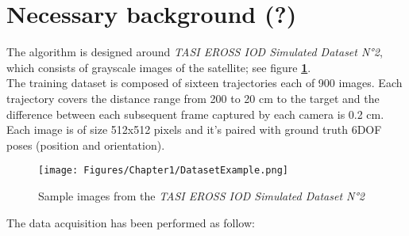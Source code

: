 \section{Necessary background (?)}
\label{Chapter1/Dataset}
The algorithm is designed around \textit{TASI EROSS IOD Simulated Dataset N°2}, which consists of grayscale images of the satellite; see figure \textbf{\ref{fig:Samples}}.\\
The training dataset is composed of sixteen trajectories each of 900 images. Each trajectory covers the distance range from 200 to 20 cm to the target and the difference between each subsequent frame captured by each camera is 0.2 cm. Each image is of size 512x512 pixels and it's paired with ground truth 6DOF poses (position and orientation).
\begin{figure}[th]
    \centering
    \texttt{[image: Figures/Chapter1/DatasetExample.png]}
    \caption[Sample images from \textit{TASI EROSS IOD Simulated Dataset N°2}]{Sample images from the \textit{TASI EROSS IOD Simulated Dataset N°2}}
    \label{fig:Samples}
\end{figure}
\newpage
The data acquisition has been performed as follow:
